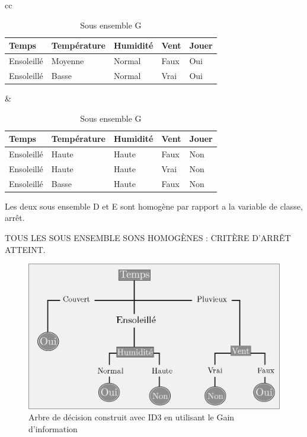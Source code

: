 \documentclass[a4paper, 11pt]{report}
\begin{document}
\begin{itemize}
\begin{table}[!h]
\begin{small}
\begin{tabular}{cc}

    \begin{minipage}{.5\linewidth}
   
\begin{tabular}{| l | l | l | l | l |}
\hline
Temps & Température & Humidité & Vent & Jouer \\
\hline
Ensoleillé & Moyenne & Normal & Faux &  \cellcolor{yellow}Oui \\
\hline
Ensoleillé & Basse & Normal & Vrai &  \cellcolor{yellow}Oui \\
\hline
\end{tabular}

      \caption{Sous ensemble F}

    \end{minipage} &

    \begin{minipage}{.5\linewidth}


\begin{tabular}{| l | l | l | l | l |}
\hline
Temps & Température & Humidité & Vent & Jouer \\
\hline
Ensoleillé & Haute & Haute & Faux & \cellcolor{green}Non \\
\hline
Ensoleillé & Haute & Haute & Vrai & \cellcolor{green}Non \\
Ensoleillé & Basse & Haute & Faux &  \cellcolor{green}Non \\
\hline
\end{tabular}
      \caption{Sous ensemble G}
 
   \end{minipage} 
\end{tabular}
\end{small}	
Les deux sous ensemble D et E sont homogène par rapport a la variable de classe, arrêt.
\end{table}
\end{itemize}
TOUS LES SOUS ENSEMBLE SONS HOMOGÈNES : CRITÈRE D'ARRÊT ATTEINT.

\begin{figure}[!h]
\begin{center}
\includegraphics[scale=3]{figure_GI}
\caption{Arbre de décision construit avec ID3 en utilisant le Gain d'information}
\end{center}
\end{figure}
\end{document}
